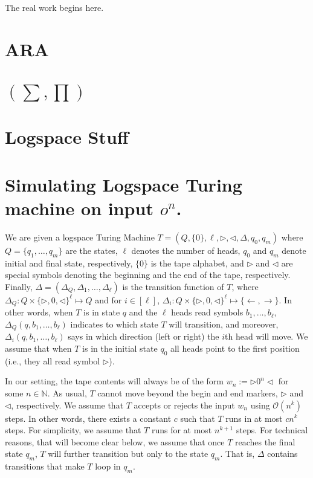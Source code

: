 The real work begins here.

\section{ARA}

\section{\lang$(\sum,\prod)$}


\section{Logspace Stuff}

\section*{Simulating Logspace Turing machine on input $o^n$.}

We are given a logspace Turing Machine $T=\left(Q,\{0\},\ell,\rhd,\lhd,\Delta,q_0,q_m\right)$ where $Q=\{q_1,\ldots,q_m\}$ are the states, $\ell$ denotes the number of heads, $q_0$ and $q_m$ denote initial and final state, respectively, $\{0\}$ is the tape alphabet, and $\rhd$ and $\lhd$ are special symbols denoting the beginning and the end of the tape, respectively. Finally,
$\Delta=(\Delta_Q,\Delta_1,\ldots,\Delta_\ell)$ is the transition function of $T$, where $\Delta_Q:Q\times \{\rhd,0,\lhd\}^\ell\mapsto Q$ and for $i\in[\ell]$,
$\Delta_i:Q\times  \{\rhd,0,\lhd\}^\ell\mapsto\{\gets,\to\}$. In other words, when $T$ is in state $q$ and the $\ell$ heads read symbols $b_1,\ldots,b_\ell$, $\Delta_Q(q,b_1,\ldots,b_\ell)$ indicates to which state $T$ will transition, and moreover, $\Delta_i(q,b_1,\ldots,b_\ell)$ says in which direction (left or right) the $i$th head will move. We assume that when $T$ is in the initial state $q_0$ all heads point to the first position (i.e., they all read symbol $\rhd$). 

In our setting, the tape contents will always be of the form $w_n:=\rhd 0^n \lhd$ for some $n\in\mathbb{N}$. As usual, $T$ cannot move beyond the begin and end markers, $\rhd$ and $\lhd$, respectively. We assume that $T$ accepts or rejects the input $w_n$ using $\mathcal{O}(n^k)$ steps. In other words, there exists a constant $c$ such that $T$ runs in at most $cn^k$ steps. For simplicity, we assume that $T$ runs for at most $n^{k+1}$ steps. For technical reasons, that will become clear below, we assume that once $T$ reaches the final state $q_m$, $T$ will further transition but only to the state $q_m$. That is, $\Delta$ contains transitions that make $T$ loop in $q_m$.

